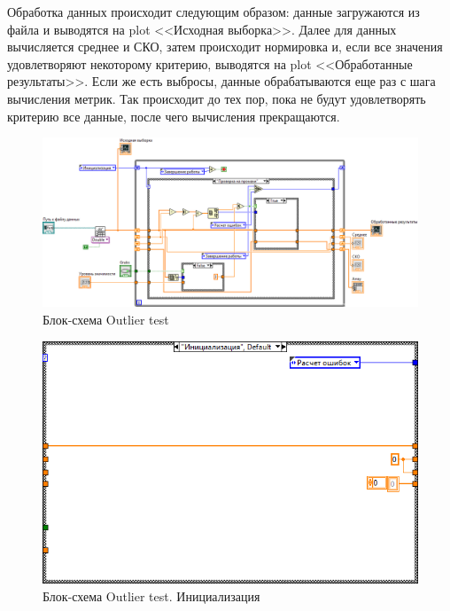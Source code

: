 \documentclass[a4paper,14pt]{article}
\begin{document}
Обработка данных происходит следующим образом: данные загружаются из файла и выводятся на plot <<Исходная выборка>>. 
Далее для данных вычисляется среднее и СКО, затем происходит нормировка и, если все значения удовлетворяют некоторому критерию, выводятся на plot <<Обработанные результаты>>.
Если же есть выбросы, данные обрабатываются еще раз с шага вычисления метрик.
Так происходит до тех пор, пока не будут удовлетворять критерию все данные, после чего вычисления прекращаются.

\begin{figure}[H]
	\centering		
	\includegraphics[width=\linewidth]{image/ot_schema}
	\caption{Блок-схема Outlier test}\label{img:ot_schema}
\end{figure}

\begin{figure}[H]
	\centering		
	\includegraphics[width=0.5\linewidth]{image/ot_schema_init}
	\caption{Блок-схема Outlier test. Инициализация}\label{img:ot_schema_init}
\end{figure}
\end{document}
